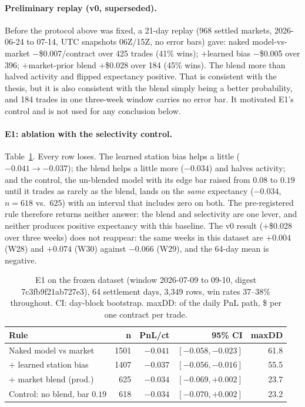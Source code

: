 \documentclass[sigconf,review,anonymous]{acmart}
\begin{document}
\paragraph{Preliminary replay (v0, superseded).} Before the protocol above was
fixed, a 21-day replay (968 settled markets, 2026-06-24 to 07-14, UTC
snapshots 06Z/15Z, no error bars) gave: naked model-vs-market
$-$\$0.007/contract over 425 trades (41\% wins); $+$learned bias
$-$\$0.005 over 396; $+$market-prior blend $+$\$0.028 over 184 (45\% wins).
The blend more than halved activity and flipped expectancy positive. That is
consistent with the thesis, but it is also consistent with the blend simply
being a better probability, and 184 trades in one three-week window carries no
error bar. It motivated E1's control and is not used for any conclusion below.

\paragraph{E1: ablation with the selectivity control.}
Table~\ref{tab:ablation}. Every row loses. The learned station bias helps a
little ($-0.041 \to -0.037$); the blend helps a little more ($-0.034$) and
halves activity; and the control, the un-blended model with its edge bar raised
from $0.08$ to $0.19$ until it trades as rarely as the blend, lands on the
\emph{same} expectancy ($-0.034$, $n=618$ vs.\ $625$) with an interval that
includes zero on both. The pre-registered rule therefore returns neither
answer: the blend and selectivity are one lever, and neither produces positive
expectancy with this baseline. The v0 result ($+$\$0.028 over three weeks) does
not reappear: the same weeks in this dataset are $+0.004$ (W28) and $+0.074$
(W30) against $-0.066$ (W29), and the 64-day mean is negative.

\begin{table}[t]
\centering
\small
\begin{tabular}{@{}p{3.1cm}rrrr@{}}
\toprule
\textbf{Rule} & \textbf{n} & \textbf{PnL/ct} & \textbf{95\% CI} & \textbf{maxDD} \\
\midrule
Naked model vs market & 1501 & $-0.041$ & $[-0.058, -0.023]$ & 61.8 \\
\quad $+$ learned station bias & 1407 & $-0.037$ & $[-0.056, -0.016]$ & 55.5 \\
\quad\quad $+$ market blend (prod.) & 625 & $-0.034$ & $[-0.069, +0.002]$ & 23.7 \\
Control: no blend, bar $0.19$ & 618 & $-0.034$ & $[-0.070, +0.002]$ & 23.2 \\
\bottomrule
\end{tabular}
\caption{E1 on the frozen dataset (window 2026-07-09 to 09-10, digest
7c3fb9f21ab727e3), 64 settlement days, 3{,}349 rows, win rates 37--38\%
throughout. CI: day-block bootstrap. maxDD: of the daily PnL path, \$
per one contract per trade.}
\label{tab:ablation}
\end{table}
\end{document}
